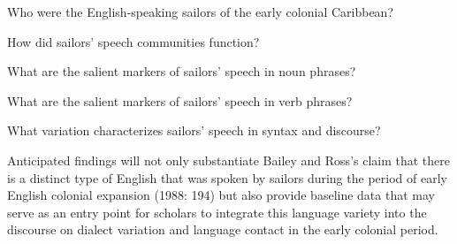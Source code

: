 \setcounter{listWWNumileveli}{0}
\begin{listWWNumileveli}
\item 
\begin{styleNormali}
Who were the English-speaking sailors of the early colonial Caribbean?
\end{styleNormali}

\item 
\begin{styleNormali}
How did sailors’ speech communities function?
\end{styleNormali}

\item 
\begin{styleNormali}
What are the salient markers of sailors’ speech in noun phrases?
\end{styleNormali}

\item 
\begin{styleNormali}
What are the salient markers of sailors’ speech in verb phrases?
\end{styleNormali}

\item 
\begin{styleNormali}
What variation characterizes sailors’ speech in syntax and discourse?
\end{styleNormali}

\end{listWWNumileveli}
\begin{styleNormali}
Anticipated findings will not only substantiate Bailey and Ross’s claim that there is a distinct type of English that was spoken by sailors during the period of early English colonial expansion (1988: 194) but also provide baseline data that may serve as an entry point for scholars to integrate this language variety into the discourse on dialect variation and language contact in the early colonial period. 
\end{styleNormali}


